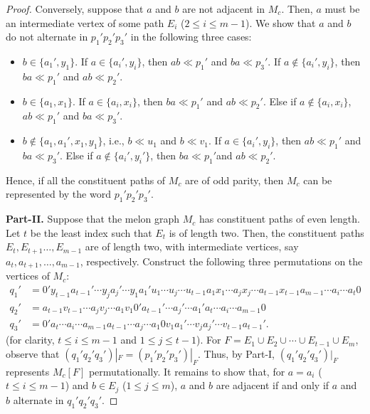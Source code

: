 \documentclass{llncs}
\begin{document}
\begin{proof}
	
	Conversely, suppose that $a$ and $b$ are not adjacent in $M_c$. Then, $a$ must be an intermediate vertex of some path $E_i$ ($2 \le i \le m-1$). We show that  $a$ and $b$ do not alternate in $p_1'p_2'p_3'$ in the following three cases:
	
	\begin{itemize}
		\item $b \in \{a_1', y_1\}$. If $a \in \{a_i', y_i\}$, then $ab \ll p_1'$ and $ba \ll p_3'$. If $a \not  \in \{a_i', y_i\}$, then $ba \ll p_1'$ and $ab \ll p_2'$.
		
		\item $b \in \{a_1,x_1\}$. If $a  \in \{a_i, x_i\}$, then $ba \ll p_1'$ and $ab \ll p_2'$. Else if $a  \not \in \{a_i, x_i\}$, $ab \ll p_1'$ and $ba \ll p_3'$.
		
		\item $b \not \in \{a_1,a_1',x_1,y_1\}$, i.e., $b \ll u_1$ and $b \ll v_1$. If $a  \in \{a_i', y_i\}$, then $ab \ll p_1'$ and $ba \ll p_3'$. Else if $a \not \in \{a_i',y_i'\}$, then $ba \ll p_1'$and $ab \ll p_2'$.
	\end{itemize}
	Hence, if all the constituent paths of $M_c$ are of odd parity,  then $M_c$ can be represented by the word $p_1'p_2'p_3'$. 
	
	\noindent\textbf{Part-II.} Suppose that the melon graph $M_c$ has constituent paths of even length. Let $t$ be the least index such that $E_t$ is of length two. Then, the constituent paths  $E_t, E_{t+1} \ldots, E_{m-1}$ are of length two, with intermediate vertices, say $a_t, a_{t+1}, \ldots, a_{m-1}$, respectively. Construct the following three permutations on the vertices of $M_c$:
	\begin{align*}
		q_1' &= 0' y_{t-1} a_{t-1}' \cdots y_j a_j' \cdots y_1 a_1'  u_{1} \cdots u_j  \cdots  u_{t-1}    a_1 x_1 \cdots a_j x_j   \cdots  a_{t-1} x_{t-1}  a_{m-1} \cdots a_{i} \cdots a_{t} 0 \\
		q_2' &=  a_{t-1}v_{t-1}        \cdots  a_jv_j \cdots a_1 v_1    0'a_{t-1}'     \cdots a_{j}' \cdots a_1' a_t \cdots a_{i} \cdots a_{m-1} 0\\
		q_3' &= 0'  a_t \cdots a_{i} \cdots a_{m-1} a_{t-1} \cdots a_{j} \cdots a_1 0 v_{1}a_{1}' \cdots v_ja_j' \cdots      v_{t-1} a_{t-1}'.
	\end{align*} (for clarity, $t \le i \le m-1$ and $1 \le j \le t-1$). 
	For $F = E_1 \cup E_2 \cup \cdots \cup E_{t-1} \cup E_{m}$, observe that $(q_1'q_2'q_3')|_F = (p_1'p_2'p_3')|_F$. Thus, by Part-I, $(q_1'q_2'q_3')|_F$  represents $M_c[F]$ permutationally. It remains to show that, for $a = a_i$ ($t \le i\le m-1$) and $b \in E_j$ ($1 \le j \le m$), $a$ and $b$ are adjacent if and only if $a$ and $b$ alternate in $q_1'q_2'q_3'$.
	

\end{proof}
\end{document}
